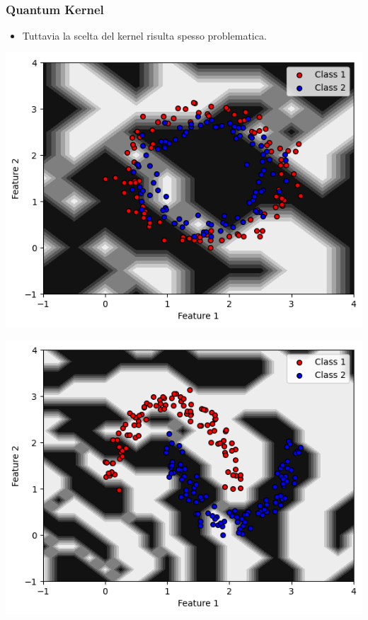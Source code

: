 \documentclass{beamer}
\begin{document}
\begin{frame}
  \frametitle{Quantum Kernel}
  \begin{itemize}
    \item Tuttavia la scelta del kernel risulta spesso problematica. 
  \end{itemize}
  \vspace{0.8cm}
  \begin{minipage}{0.5\textwidth}
     \centering
     \includegraphics[width=\textwidth]{images/failcircle.png}
 \end{minipage}%
 \begin{minipage}{0.5\textwidth}
     \centering
     \includegraphics[width=\textwidth]{images/failmoon.png}
 \end{minipage}
\end{frame}
\end{document}
